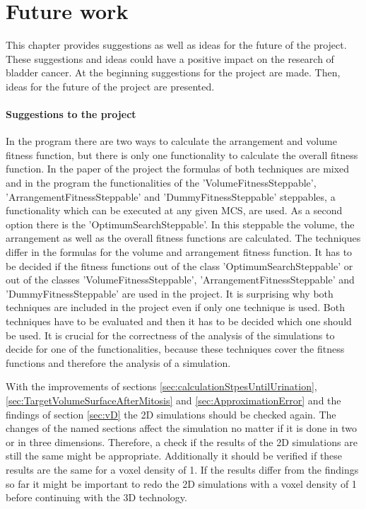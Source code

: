 \chapter{Future work}
This chapter provides suggestions as well as ideas for the future of the project. These suggestions and ideas could have a positive impact on the research of bladder cancer. At the beginning suggestions for the project are made. Then, ideas for the future of the project are presented.

\subsubsection{Suggestions to the project}
In the program there are two ways to calculate the arrangement and volume fitness function, but there is only one functionality to calculate the overall fitness function. In the paper of the project \cite{Torelli2017} the formulas of both techniques are mixed and in the program the functionalities of the 'VolumeFitnessSteppable', 'ArrangementFitnessSteppable' and 'DummyFitnessSteppable' steppables, a functionality which can be executed at any given \ac{MCS}, are used. As a second option there is the 'OptimumSearchSteppable'. In this steppable the volume, the arrangement as well as the overall fitness functions are calculated. The techniques differ in the formulas for the volume and arrangement fitness function. It has to be decided if the fitness functions out of the class 'OptimumSearchSteppable' or out of the classes 'VolumeFitnessSteppable', 'ArrangementFitnessSteppable' and 'DummyFitnessSteppable' are used in the project. It is surprising why both techniques are included in the project even if only one technique is used. \newline
Both techniques have to be evaluated and then it has to be decided which one should be used. It is crucial for the correctness of the analysis of the simulations to decide for one of the functionalities, because these techniques cover the fitness functions and therefore the analysis of a simulation.


With the improvements of sections \ref{sec:calculationStpesUntilUrination}, \ref{sec:TargetVolumeSurfaceAfterMitosis} and \ref{sec:ApproximationError} and the findings of section \ref{sec:vD} the 2D simulations should be checked again. The changes of the named sections affect the simulation no matter if it is done in two or in three dimensions. Therefore, a check if the results of the 2D simulations are still the same might be appropriate. Additionally it should be verified if these results are the same for a voxel density of 1. If the results differ from the findings so far it might be important to redo the 2D simulations with a voxel density of 1 before continuing with the 3D technology.

